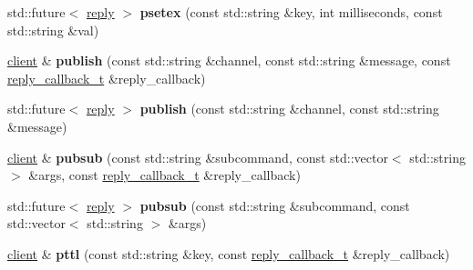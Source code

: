 \begin{DoxyCompactItemize}
\item 
\mbox{\label{classcpp__redis_1_1client_a69712c925c1496ab9531a5fd1888ad93}} 
std\+::future$<$ \hyperlink{classcpp__redis_1_1reply}{reply} $>$ {\bfseries psetex} (const std\+::string \&key, int milliseconds, const std\+::string \&val)
\item 
\mbox{\label{classcpp__redis_1_1client_a1fba121a3d6e50811448e35917badfc6}} 
\hyperlink{classcpp__redis_1_1client}{client} \& {\bfseries publish} (const std\+::string \&channel, const std\+::string \&message, const \hyperlink{classcpp__redis_1_1client_a061a1140d36d2eaeda82b09a0bb3f9f2}{reply\+\_\+callback\+\_\+t} \&reply\+\_\+callback)
\item 
\mbox{\label{classcpp__redis_1_1client_ad9a8434b4ca46e185bab45cf135c9ac2}} 
std\+::future$<$ \hyperlink{classcpp__redis_1_1reply}{reply} $>$ {\bfseries publish} (const std\+::string \&channel, const std\+::string \&message)
\item 
\mbox{\label{classcpp__redis_1_1client_a4c606e08e8787971044b76930b99f30d}} 
\hyperlink{classcpp__redis_1_1client}{client} \& {\bfseries pubsub} (const std\+::string \&subcommand, const std\+::vector$<$ std\+::string $>$ \&args, const \hyperlink{classcpp__redis_1_1client_a061a1140d36d2eaeda82b09a0bb3f9f2}{reply\+\_\+callback\+\_\+t} \&reply\+\_\+callback)
\item 
\mbox{\label{classcpp__redis_1_1client_a9f5ae4ef589038af3f7e8304a56446e2}} 
std\+::future$<$ \hyperlink{classcpp__redis_1_1reply}{reply} $>$ {\bfseries pubsub} (const std\+::string \&subcommand, const std\+::vector$<$ std\+::string $>$ \&args)
\item 
\mbox{\label{classcpp__redis_1_1client_a2f10778d114d8144416b09645a7c6416}} 
\hyperlink{classcpp__redis_1_1client}{client} \& {\bfseries pttl} (const std\+::string \&key, const \hyperlink{classcpp__redis_1_1client_a061a1140d36d2eaeda82b09a0bb3f9f2}{reply\+\_\+callback\+\_\+t} \&reply\+\_\+callback)
\item 
\mbox{\label{classcpp__redis_1_1client_adf173046c5866f6a9b9cd297a79b3028}} 

\end{DoxyCompactItemize}
